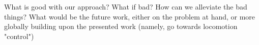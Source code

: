 \documentclass[a4paper, 10pt, conference]{ieeeconf}
\begin{document}
 What is good with our approach? What if bad? How can we alleviate the bad things? What would be the future work, either on the problem at hand, or more globally building upon the presented work (namely, go towards locomotion "control")
 

%
\end{document}
